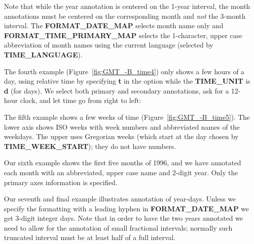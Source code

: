
Note that while the year annotation is centered on the 1-year interval, the month annotations must be centered
on the corresponding month and \emph{not} the 3-month interval.  The \textbf{FORMAT\_DATE\_MAP} selects month
name only and \textbf{FORMAT\_TIME\_PRIMARY\_MAP} selects the 1-character, upper case abbreviation of month names using
the current language (selected by \textbf{TIME\_LANGUAGE}).

The fourth example (Figure~\ref{fig:GMT_-B_time4}) only shows a few hours of a day, using relative time by
specifying \textbf{t} in the  option while the \textbf{TIME\_UNIT} is \textbf{d} (for days).
We select both primary and
secondary annotations, ask for a 12-hour clock, and let time go from right to left:


The fifth example shows a few weeks of time (Figure~\ref{fig:GMT_-B_time5}).  The lower axis shows ISO weeks with
week numbers and abbreviated names of the weekdays.   The upper uses Gregorian weeks (which start at the day chosen
by \textbf{TIME\_WEEK\_START}); they do not have numbers.


Our sixth example shows the first five months of 1996, and we have annotated each month with an abbreviated, upper case
name and 2-digit year.  Only the primary axes information is specified.



Our seventh and final example illustrates annotation of year-days.  Unless we specify the formatting with a leading hyphen
in  \textbf{FORMAT\_DATE\_MAP} we get 3-digit integer days.  Note that in order to have the two years
annotated we need to allow for the annotation of small fractional intervals; normally such truncated interval must
be at least half of a full interval.



